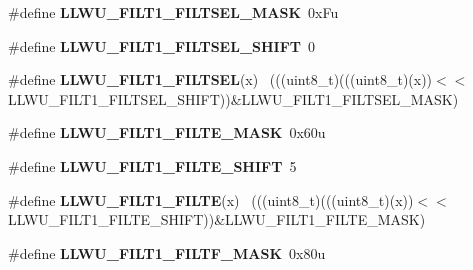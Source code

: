 \begin{DoxyCompactItemize}
\item 
\hypertarget{group___l_l_w_u___register___masks_gaa44e21d07f509d1f5d6cec9da32ab8ab}{}\#define {\bfseries L\+L\+W\+U\+\_\+\+F\+I\+L\+T1\+\_\+\+F\+I\+L\+T\+S\+E\+L\+\_\+\+M\+A\+S\+K}~0x\+Fu\label{group___l_l_w_u___register___masks_gaa44e21d07f509d1f5d6cec9da32ab8ab}

\item 
\hypertarget{group___l_l_w_u___register___masks_gaab2a7991b2b135f0557b1b41cc3528f7}{}\#define {\bfseries L\+L\+W\+U\+\_\+\+F\+I\+L\+T1\+\_\+\+F\+I\+L\+T\+S\+E\+L\+\_\+\+S\+H\+I\+F\+T}~0\label{group___l_l_w_u___register___masks_gaab2a7991b2b135f0557b1b41cc3528f7}

\item 
\hypertarget{group___l_l_w_u___register___masks_ga40cff44853a583ea7ff5a043a335944b}{}\#define {\bfseries L\+L\+W\+U\+\_\+\+F\+I\+L\+T1\+\_\+\+F\+I\+L\+T\+S\+E\+L}(x)                                    ~(((uint8\+\_\+t)(((uint8\+\_\+t)(x))$<$$<$L\+L\+W\+U\+\_\+\+F\+I\+L\+T1\+\_\+\+F\+I\+L\+T\+S\+E\+L\+\_\+\+S\+H\+I\+F\+T))\&L\+L\+W\+U\+\_\+\+F\+I\+L\+T1\+\_\+\+F\+I\+L\+T\+S\+E\+L\+\_\+\+M\+A\+S\+K)\label{group___l_l_w_u___register___masks_ga40cff44853a583ea7ff5a043a335944b}

\item 
\hypertarget{group___l_l_w_u___register___masks_gae449f984f9cfeec99ab8380e356b57c7}{}\#define {\bfseries L\+L\+W\+U\+\_\+\+F\+I\+L\+T1\+\_\+\+F\+I\+L\+T\+E\+\_\+\+M\+A\+S\+K}~0x60u\label{group___l_l_w_u___register___masks_gae449f984f9cfeec99ab8380e356b57c7}

\item 
\hypertarget{group___l_l_w_u___register___masks_ga0d4b7527c910e60bdf1f52e51b1c0932}{}\#define {\bfseries L\+L\+W\+U\+\_\+\+F\+I\+L\+T1\+\_\+\+F\+I\+L\+T\+E\+\_\+\+S\+H\+I\+F\+T}~5\label{group___l_l_w_u___register___masks_ga0d4b7527c910e60bdf1f52e51b1c0932}

\item 
\hypertarget{group___l_l_w_u___register___masks_ga8e8244f4f88e8763dea3366dbfdd36a6}{}\#define {\bfseries L\+L\+W\+U\+\_\+\+F\+I\+L\+T1\+\_\+\+F\+I\+L\+T\+E}(x)                                        ~(((uint8\+\_\+t)(((uint8\+\_\+t)(x))$<$$<$L\+L\+W\+U\+\_\+\+F\+I\+L\+T1\+\_\+\+F\+I\+L\+T\+E\+\_\+\+S\+H\+I\+F\+T))\&L\+L\+W\+U\+\_\+\+F\+I\+L\+T1\+\_\+\+F\+I\+L\+T\+E\+\_\+\+M\+A\+S\+K)\label{group___l_l_w_u___register___masks_ga8e8244f4f88e8763dea3366dbfdd36a6}

\item 
\hypertarget{group___l_l_w_u___register___masks_gabdb5ca902522996074a75ed08a7a8b03}{}\#define {\bfseries L\+L\+W\+U\+\_\+\+F\+I\+L\+T1\+\_\+\+F\+I\+L\+T\+F\+\_\+\+M\+A\+S\+K}~0x80u\label{group___l_l_w_u___register___masks_gabdb5ca902522996074a75ed08a7a8b03}


\end{DoxyCompactItemize}

